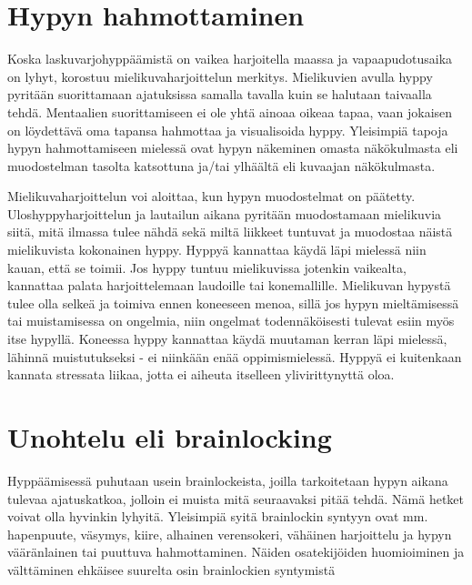 \section{ Hypyn hahmottaminen }
\label{mielikuva-eli-mentaaliharjoittelu-hypyn-hahmottaminen}


Koska laskuvarjohyppäämistä on vaikea harjoitella maassa ja vapaapudotusaika on lyhyt, korostuu mielikuvaharjoittelun merkitys. Mielikuvien avulla hyppy pyritään suorittamaan ajatuksissa samalla tavalla kuin se halutaan taivaalla tehdä. Mentaalien suorittamiseen ei ole yhtä ainoaa oikeaa tapaa, vaan jokaisen on löydettävä oma tapansa hahmottaa ja visualisoida hyppy. Yleisimpiä tapoja hypyn hahmottamiseen mielessä ovat hypyn näkeminen omasta näkökulmasta eli muodostelman tasolta katsottuna ja/tai ylhäältä eli kuvaajan näkökulmasta. 


Mielikuvaharjoittelun voi aloittaa, kun hypyn muodostelmat on päätetty. Uloshyppyharjoittelun ja lautailun aikana pyritään muodostamaan mielikuvia siitä, mitä ilmassa tulee nähdä sekä miltä liikkeet tuntuvat ja muodostaa näistä mielikuvista kokonainen hyppy. Hyppyä kannattaa käydä läpi mielessä niin kauan, että se toimii. Jos hyppy tuntuu mielikuvissa jotenkin vaikealta, kannattaa palata harjoittelemaan laudoille tai konemallille. Mielikuvan hypystä tulee olla selkeä ja toimiva ennen koneeseen menoa, sillä jos hypyn mieltämisessä tai muistamisessa on ongelmia, niin ongelmat todennäköisesti tulevat esiin myös itse hypyllä. Koneessa hyppy kannattaa käydä muutaman kerran läpi mielessä, lähinnä muistutukseksi - ei niinkään enää oppimismielessä. Hyppyä ei kuitenkaan kannata stressata liikaa, jotta ei aiheuta itselleen ylivirittynyttä oloa. 

\section{ Unohtelu eli brainlocking }
\label{mielikuva-eli-mentaaliharjoittelu-unohtelu-eli-brainlocking}


Hyppäämisessä puhutaan usein brainlockeista, joilla tarkoitetaan hypyn aikana tulevaa ajatuskatkoa, jolloin ei muista mitä seuraavaksi pitää tehdä. Nämä hetket voivat olla hyvinkin lyhyitä. Yleisimpiä syitä brainlockin syntyyn ovat mm. hapenpuute, väsymys, kiire, alhainen verensokeri, vähäinen harjoittelu ja hypyn vääränlainen tai puuttuva hahmottaminen. Näiden osatekijöiden huomioiminen ja välttäminen ehkäisee suurelta osin brainlockien syntymistä 

